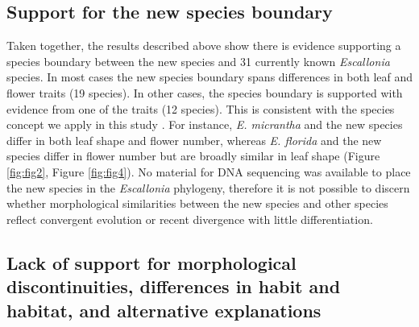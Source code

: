 \documentclass[fleqn,10pt,lineno]{wlpeerj} %
\begin{document}
\subsection*{Support for the new species boundary}

Taken together, the results described above show there is evidence supporting a species boundary between the new species and 31 currently known \emph{Escallonia} species. In most cases the new species boundary spans differences in both leaf and flower traits (19 species). In other cases, the species boundary is supported with evidence from one of the traits (12 species). This is consistent with the species concept we apply in this study \citep{deQueiroz:2007di}. For instance, \emph{E. micrantha} and the new species differ in both leaf shape and flower number, whereas \emph{E. florida} and the new species differ in flower number but are broadly similar in leaf shape (Figure \ref{fig:fig2}, Figure \ref{fig:fig4}). No material for DNA sequencing was available to place the new species in the \emph{Escallonia} phylogeny, therefore it is not possible to discern whether morphological similarities between the new species and other species reflect convergent evolution or recent divergence with little differentiation.

\subsection*{Lack of support for morphological discontinuities, differences in habit and habitat, and  alternative explanations}
\end{document}
